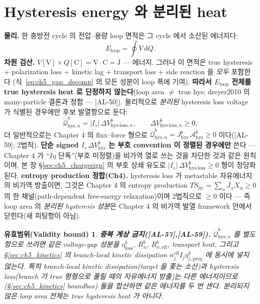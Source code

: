 \documentclass[11pt,a4paper]{article}
\newtheorem*{boundbox}{유효범위(Validity bound)}
\newcommand{\dd}{\mathrm{d}}
\newcommand{\eff}{\mathrm{eff}}
\newcommand{\irr}{\mathrm{irr}}
\newcommand{\prog}{\mathrm{prog}}
\newcommand{\hys}{\mathrm{hys}}
\newcommand{\loss}{\mathrm{loss}}
\newcommand{\AL}[1]{\textsf{[AL-#1]}}
\begin{document}
\section{Hysteresis energy 와 분리된 heat}\label{sec:ch5_hysheat}
\textbf{물리.} 한 충방전 cycle 의 전압--용량 loop 면적은 그 cycle 에서 소산된 에너지다:
\begin{equation}
E_{\mathrm{loop}}=\oint V\,\dd Q.
\label{eq:ch5_loop_area}
\end{equation}
\textbf{차원 검산.} $V[\mathrm V]\times Q[\mathrm C]=\mathrm{V\cdot C}=\mathrm J$ — 에너지. 그러나 이 면적은
true hysteresis + polarization loss + kinetic lag + transport loss + side reaction 을 \emph{모두} 포함한다
(식~\eqref{eq:ch5_gap_decomp} 의 모든 성분이 loop 폭에 기여). \textbf{따라서 $E_{\mathrm{loop}}$ 전체를 true
hysteresis heat 로 단정하지 않는다}(loop area $\ne$ true hys; dreyer2010 의 many-particle 결론과 정합 —
\AL{50}). 물리적으로 \emph{분리된} hysteresis loss voltage 가 식별된 경우에만 후보 발열항으로 둔다:
\begin{equation}
\dot{\mathcal Q}_{\hys,n}^b=|I_s|\,\Delta V_{\hys\text{-}\loss,n}^b,\qquad \Delta V_{\hys\text{-}\loss,n}^b\ge0,
\label{eq:ch5_hys_heat}
\end{equation}
더 일반적으로는 Chapter 4 의 flux--force 형으로 $\dot{\mathcal Q}_{\hys,n}^b=J_\hys^b\,\mathcal A_\hys^b\ge0$
이다(\AL{59}; 2법칙). \textbf{단순 signed $I_s\,\Delta V_\hys^b$ 는 부호 convention 이 정렬된 경우에만} 쓴다
— Chapter 4 가 ``$I\eta$ 단독''(부호 미정렬)을 비가역 열로 쓰는 것을 차단한 것과 같은 원칙이며, 본 장
\S\ref{sec:ch5_chargesign} 의 부호 상쇄 유도로 $|I_s|\,\Delta V_{\hys\text{-}\loss}^b\ge0$ 형이 정당화된다.
\textbf{entropy production 정합(Ch4).} hysteresis loss 가 metastable 자유에너지의 비가역 방출이면, 그것은
Chapter 4 의 entropy production $T\dot S_\irr=\sum_\alpha J_\alpha X_\alpha\ge0$ 의 한 채널(path-dependent
free-energy relaxation)이며 2법칙으로 $\ge0$ 이다 — 즉 loop area 의 \emph{분리된 hysteresis 성분}은 Chapter 4
의 비가역 발열 framework 안에서 닫힌다(새 피팅항이 아님).
\begin{boundbox}
\textbf{중복 계상 금지(\AL{57},\AL{59}).} $\dot{\mathcal Q}_{\hys,n}^b$ 를 별도 항으로 쓰려면 같은 voltage-gap
성분을 $\eta_\loss^b$, $R_n^b$, $R_{n,\eff}^b$, transport heat, 그리고 \S\ref{sec:ch5_kinetics} 의 branch-local
kinetic dissipation $n_j^{\eff}I_j\eta_{j,\prog}^b$ 에 \emph{동시에} 넣지 않는다. 특히 branch-local kinetic
dissipation(target 을 좇는 소산)과 hysteresis loss(branch 가 true 평형으로 풀릴 때의 자유에너지 방출)는
\emph{다른 에너지}이므로(\S\ref{sec:ch5_kinetics} boundbox) 둘을 합산하면 같은 에너지를 두 번 센다. 분리되지
않은 loop area 전체는 true hysteresis heat 가 아니다.
\end{boundbox}
\end{document}
